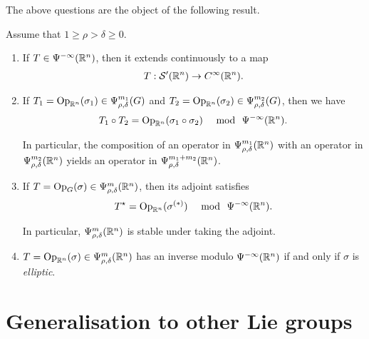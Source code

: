 The above questions are the object of the following result.
\begin{theorem}
    Assume that $1 \geq \rho > \delta \geq 0$.
    \begin{enumerate}
        \item If $T \in \SmoothingOperators [\R^n]$,
            then it extends continuously to a map
            \begin{align*}
                T : \TemperedDistributions {\R^n} \to \SmoothFunctions {\R^n}.
            \end{align*}
        \item If $T_1 = \Op [\R^n] (\sigma_1) \in \OperatorClass {m_1} {\rho, \delta}$ and $T_2 = \Op [\R^n] (\sigma_2) \in \OperatorClass {m_2} {\rho, \delta}$,
            then we have
            \begin{align*}
                T_1 \circ T_2
                = \Op [\R^n] (\sigma_1 \circ \sigma_2)
                \quad \text{ mod }\ \SmoothingOperators [\R^n].
            \end{align*}

            In particular,
            the composition of an operator in $\OperatorClass [\R^n] {m_1} {\rho, \delta}$
            with an operator in $\OperatorClass [\R^n] {m_2} {\rho, \delta}$
            yields an operator in $\OperatorClass [\R^n] {m_1 + m_2} {\rho, \delta}$.
        \item If $T = \Op(\sigma) \in \OperatorClass [\R^n] m {\rho, \delta}$,
            then its adjoint satisfies
            \begin{align*}
                \adj T
                = \Op [\R^n] (\sigma^{(*)})
                \quad \text{ mod }\ \SmoothingOperators [\R^n].
            \end{align*}

            In particular,
            $\OperatorClass [\R^n] m {\rho, \delta}$ is stable under taking the adjoint.
        \item $T = \Op [\R^n] (\sigma) \in \OperatorClass [\R^n] m {\rho, \delta}$
            has an inverse modulo $\SmoothingOperators [\R^n]$
            if and only if $\sigma$ is \emph{elliptic}.
    \end{enumerate}
\end{theorem}

\section{Generalisation to other Lie groups}

